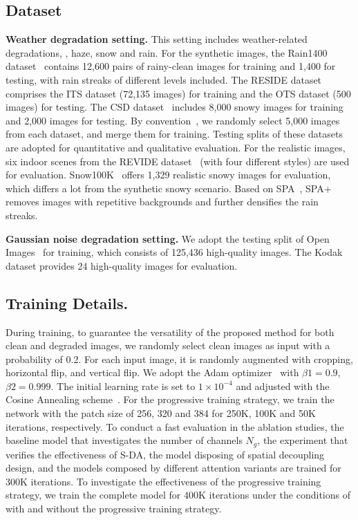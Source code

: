 \subsection{Dataset}\label{supp_sec:dataset}  
\noindent \textbf{Weather degradation setting.}
This setting includes weather-related degradations, \ie, haze, snow and rain.  For the synthetic images,  the Rain1400 dataset~\cite{rain1400}  contains 12,600 pairs of rainy-clean images for training and 1,400 for testing, with rain streaks of different levels included. The RESIDE dataset~\cite{reside}  comprises the ITS dataset (72,135 images) for training and the OTS dataset (500 images) for testing. The CSD dataset~\cite{csd}  includes 8,000 snowy images for training and 2,000 images for testing.  By convention~\cite{chen2022learning,park2023all}, we randomly select 5,000 images from each dataset, and merge them for training.  Testing splits of these datasets are adopted for quantitative and qualitative evaluation.   For the realistic images, six indoor scenes from the REVIDE dataset~\cite{REVIDE} (with four different styles) are used for evaluation.  Snow100K~\cite{snow100k} offers 1,329 realistic snowy images for evaluation, which differs a lot from the synthetic snowy scenario.  Based on SPA~\cite{wang2019spatial}, SPA+~\cite{wgwsnet} removes images with repetitive backgrounds and further densifies the rain streaks.


 
\noindent \textbf{Gaussian noise degradation setting.}
We adopt the testing split of Open  Images~\cite{krasin2017openimages} for training, which consists of 125,436 high-quality images. The Kodak~\cite{kodak1993kodak} dataset provides 24 high-quality images for evaluation.

 

  \subsection{Training Details.}\label{supp:train_detail} 
During training,  to guarantee the versatility of the proposed method for both clean and degraded images, we randomly select clean images as input with a probability of 0.2.  For each input image, it is randomly augmented with cropping, horizontal flip, and vertical flip.  We adopt the Adam optimizer~\cite{kingma2014adam} with $\beta1=0.9$, $\beta2=0.999$. The initial learning rate is set to $1\times10^{-4}$ and adjusted with the Cosine Annealing scheme~\cite{sgdr}.  For the progressive training strategy, we train the network with the patch size of 256, 320 and 384 for 250K, 100K and 50K iterations, respectively. To conduct a fast evaluation in the ablation studies, the baseline model that investigates the number of channels $N_g$, the experiment that verifies the effectiveness of S-DA, the model disposing of spatial decoupling design, and the models composed by different attention variants are trained for 300K iterations.  To investigate the effectiveness of the progressive training strategy, we train the complete model for 400K iterations under the conditions of with and without the progressive training strategy.


 
  

